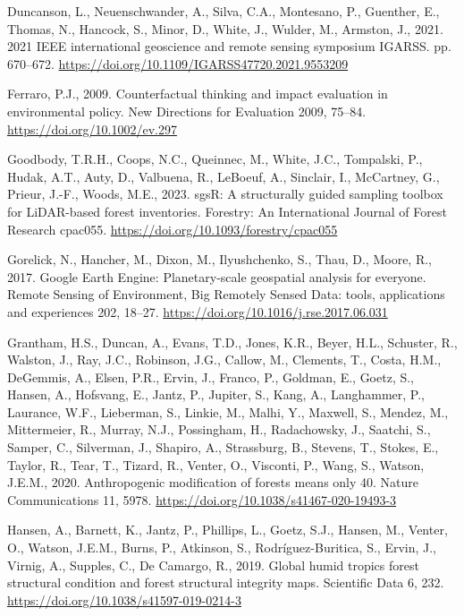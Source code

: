 \documentclass[
]{agujournal2019}
\newlength{\cslhangindent}
\newenvironment{CSLReferences}[2] %
 {\begin{list}{}{%
  \setlength{\itemindent}{0pt}
  \setlength{\leftmargin}{0pt}
  \setlength{\parsep}{0pt}
  \ifodd #1
   \setlength{\leftmargin}{\cslhangindent}
   \setlength{\itemindent}{-1\cslhangindent}
  \fi
  \setlength{\itemsep}{#2\baselineskip}}}
 {\end{list}}
\begin{document}
\begin{CSLReferences}{1}{0}
Duncanson, L., Neuenschwander, A., Silva, C.A., Montesano, P., Guenther,
E., Thomas, N., Hancock, S., Minor, D., White, J., Wulder, M., Armston,
J., 2021. 2021 IEEE international geoscience and remote sensing
symposium IGARSS. pp. 670--672.
\url{https://doi.org/10.1109/IGARSS47720.2021.9553209}

Ferraro, P.J., 2009. Counterfactual thinking and impact evaluation in
environmental policy. New Directions for Evaluation 2009, 75--84.
\url{https://doi.org/10.1002/ev.297}

Goodbody, T.R.H., Coops, N.C., Queinnec, M., White, J.C., Tompalski, P.,
Hudak, A.T., Auty, D., Valbuena, R., LeBoeuf, A., Sinclair, I.,
McCartney, G., Prieur, J.-F., Woods, M.E., 2023. sgsR: A structurally
guided sampling toolbox for LiDAR-based forest inventories. Forestry: An
International Journal of Forest Research cpac055.
\url{https://doi.org/10.1093/forestry/cpac055}

Gorelick, N., Hancher, M., Dixon, M., Ilyushchenko, S., Thau, D., Moore,
R., 2017. Google Earth Engine: Planetary-scale geospatial analysis for
everyone. Remote Sensing of Environment, Big Remotely Sensed Data:
tools, applications and experiences 202, 18--27.
\url{https://doi.org/10.1016/j.rse.2017.06.031}

Grantham, H.S., Duncan, A., Evans, T.D., Jones, K.R., Beyer, H.L.,
Schuster, R., Walston, J., Ray, J.C., Robinson, J.G., Callow, M.,
Clements, T., Costa, H.M., DeGemmis, A., Elsen, P.R., Ervin, J., Franco,
P., Goldman, E., Goetz, S., Hansen, A., Hofsvang, E., Jantz, P.,
Jupiter, S., Kang, A., Langhammer, P., Laurance, W.F., Lieberman, S.,
Linkie, M., Malhi, Y., Maxwell, S., Mendez, M., Mittermeier, R., Murray,
N.J., Possingham, H., Radachowsky, J., Saatchi, S., Samper, C.,
Silverman, J., Shapiro, A., Strassburg, B., Stevens, T., Stokes, E.,
Taylor, R., Tear, T., Tizard, R., Venter, O., Visconti, P., Wang, S.,
Watson, J.E.M., 2020. Anthropogenic modification of forests means only
40. Nature Communications 11, 5978.
\url{https://doi.org/10.1038/s41467-020-19493-3}

Hansen, A., Barnett, K., Jantz, P., Phillips, L., Goetz, S.J., Hansen,
M., Venter, O., Watson, J.E.M., Burns, P., Atkinson, S.,
Rodríguez-Buritica, S., Ervin, J., Virnig, A., Supples, C., De Camargo,
R., 2019. Global humid tropics forest structural condition and forest
structural integrity maps. Scientific Data 6, 232.
\url{https://doi.org/10.1038/s41597-019-0214-3}


\end{CSLReferences}
\end{document}

